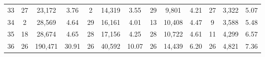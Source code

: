\begin{table}[H]
{\begin{tabular}{c c c c c c c c c c c c c}
       33 & 27  & 23,172 &  3.76 & 2  & 14,319 &  3.55 & 29  & 9,801 &  4.21 & 27  & 3,322 &  5.07 \\ 
       34 & 2  & 28,569 &  4.64 & 29  & 16,161 &  4.01 & 13  & 10,408 &  4.47 & 9  & 3,588 &  5.48 \\ 
       35 & 18  & 28,674 &  4.65 & 28  & 17,156 &  4.25 & 28  & 10,722 &  4.61 & 11  & 4,299 &  6.57 \\ 
       36 & 26  & 190,471 & 30.91 & 26  & 40,592 & 10.07 & 26  & 14,439 &  6.20 & 26  & 4,821 &  7.36 \\  
      
        \bottomrule
    \end{tabular}
    }
\end{table}
%
%
%
%
%
